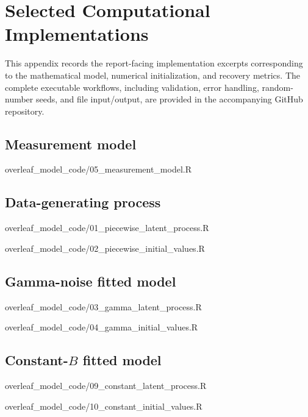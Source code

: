 \section{Selected Computational Implementations}
\label{app:code-listings}

This appendix records the report-facing implementation excerpts corresponding
to the mathematical model, numerical initialization, and recovery metrics.
The complete executable workflows, including validation, error handling,
random-number seeds, and file input/output, are provided in the accompanying
GitHub repository.

\subsection{Measurement model}

{overleaf_model_code/05_measurement_model.R}

\subsection{Data-generating process}

{overleaf_model_code/01_piecewise_latent_process.R}

{overleaf_model_code/02_piecewise_initial_values.R}

\subsection{Gamma-noise fitted model}

{overleaf_model_code/03_gamma_latent_process.R}

{overleaf_model_code/04_gamma_initial_values.R}

\subsection{Constant-\texorpdfstring{\(B\)}{B} fitted model}

{overleaf_model_code/09_constant_latent_process.R}

{overleaf_model_code/10_constant_initial_values.R}

